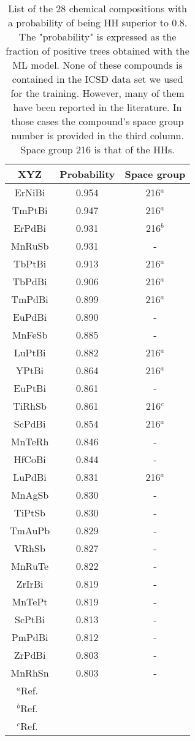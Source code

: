 \documentclass[pt10,journal=jacsat,manuscript=article,layout=twocolumn]{achemso}
\newcommand{\onlinecite}[1]{\hspace{-1 ex} \nocite{#1}\citenum{#1}}
\begin{document}
\begin{table}
\centering
\scriptsize
\begin{tabular}{ccc}
\hline
XYZ & Probability & Space group\\
\hline
ErNiBi    &       0.954  & 216$^{a}$\\
TmPtBi    &       0.947  & 216$^{a}$\\
ErPdBi    &       0.931  & 216$^{b}$\\
MnRuSb    &       0.931  & -\\
TbPtBi    &       0.913  & 216$^{a}$\\
TbPdBi    &       0.906  & 216$^{a}$\\
TmPdBi    &       0.899  & 216$^{a}$\\
EuPdBi    &       0.890  & -\\
MnFeSb    &       0.885  & -\\
LuPtBi    &       0.882  & 216$^{a}$\\
YPtBi    &       0.864  & 216$^{a}$\\
EuPtBi    &       0.861  & -\\
TiRhSb    &       0.861  & 216$^{c}$\\
ScPdBi    &       0.854  & 216$^{a}$\\
MnTeRh    &       0.846  & -\\
HfCoBi    &       0.844  & -\\
LuPdBi    &       0.831  & 216$^{a}$\\
MnAgSb    &       0.830  & -\\
TiPtSb    &       0.830  & -\\
TmAuPb    &       0.829  & -\\
VRhSb    &       0.827  & -\\
MnRuTe    &       0.822  & -\\
ZrIrBi    &       0.819  & -\\
MnTePt    &       0.819  & -\\
ScPtBi    &       0.813  & -\\
PmPdBi    &       0.812 & -\\
ZrPdBi    &       0.803  & -\\
MnRhSn    &       0.803  & -\\
\hline
$^{a}$Ref.~\onlinecite{Equiatomic}&        & \\
$^{b}$Ref.~\onlinecite{Thermoelectricandthermophysical}&        & \\
$^{c}$Ref.~\onlinecite{Alloyingbehavior}&        & \\
\end{tabular}
\caption{List of the 28 chemical compositions with a probability of being HH superior to 0.8. The "probability" is expressed as the fraction of positive trees obtained with the ML model. None of these compounds is contained in the ICSD data set we used for the training. However, many of them have been reported in the literature. In those cases the compound's space group number is provided in the third column. Space group 216 is that of the HHs.}
\end{table}
\end{document}
